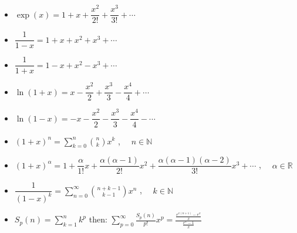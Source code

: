 {\normalsize
    \begin{itemize}
    	\item $\exp(x) = 1 + x + \dfrac{x^2}{2!} + \dfrac{x^3}{3!} + \cdots$
    	\item $\dfrac{1}{1-x} = 1 + x + x^2 + x^3 + \cdots$
    	\item $\dfrac{1}{1+x} = 1 - x + x^2 - x^3 + \cdots$
    	\item $\ln(1+x) = x - \dfrac{x^2}{2} + \dfrac{x^3}{3} - \dfrac{x^4}{4} + \cdots$
    	\item $\ln(1-x) = -x - \dfrac{x^2}{2} - \dfrac{x^3}{3} - \dfrac{x^4}{4} - \cdots$
    	\item $\displaystyle (1+x)^n = \sum_{k=0}^{n} \binom{n}{k} x^k$ , $\quad n \in \mathbb{N}$
    	\item $\displaystyle (1+x)^\alpha = 1 + \dfrac{\alpha}{1!} x + \dfrac{\alpha(\alpha-1)}{2!} x^2 + \dfrac{\alpha(\alpha-1)(\alpha-2)}{3!} x^3 + \cdots$ , $\quad \alpha \in \mathbb{R}$
    	\item $\displaystyle \dfrac{1}{(1-x)^k} = \sum_{n=0}^{\infty} \binom{n+k-1}{k-1} x^n$ , $\quad k \in \mathbb{N}$
    	\item $\displaystyle S_p(n) = \sum_{k=1}^n k^p$ then: $\displaystyle \sum_{p=0}^\infty \frac{S_p(n)}{p!}x^p = \frac{ \frac{e^{x(n+1)} - e^x}{x} }{\frac{e^x-1}{x}}$
    \end{itemize} 
}
